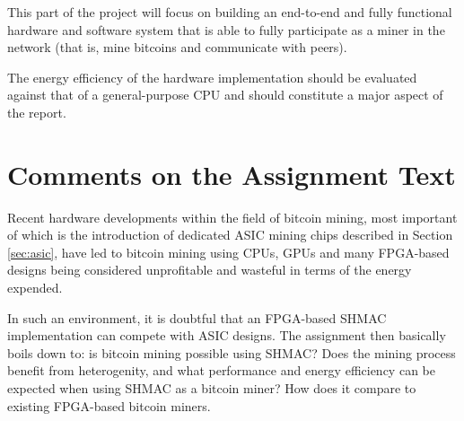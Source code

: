 This part of the project will focus on building an end-to-end and fully functional
hardware and software system that is able to fully participate as a miner in the
network (that is, mine bitcoins and communicate with peers).

The energy efficiency of the hardware implementation should be evaluated against that
of a general-purpose CPU and should constitute a major aspect of the report.

\section{Comments on the Assignment Text}

Recent hardware developments within the field of bitcoin mining, most important of
which is the introduction of dedicated ASIC mining chips described in Section \ref{sec:asic},
have led to bitcoin mining using CPUs, GPUs and many FPGA-based designs being considered
unprofitable and wasteful in terms of the energy expended.

In such an environment, it is doubtful that an FPGA-based SHMAC implementation can compete
with ASIC designs. The assignment then basically boils down to: is bitcoin mining possible using SHMAC?
Does the mining process benefit from heterogenity, and what performance and energy
efficiency can be expected when using SHMAC as a bitcoin miner? How does it compare to
existing FPGA-based bitcoin miners.


